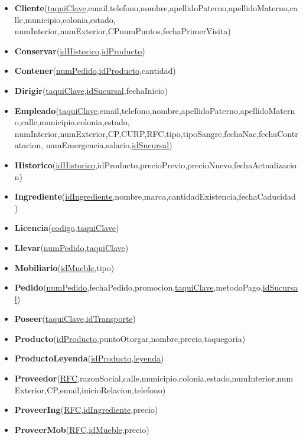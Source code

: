 \documentclass[11pt,letterpaper]{article}
\begin{document}
\begin{itemize}
\item \footnotesize{\textbf{Cliente}(\underline{taquiClave},email,telefono,nombre,apellidoPaterno,apellidoMaterno,calle,municipio,colonia,estado,
numInterior,numExterior,CPnumPuntos,fechaPrimerVisita)}
\item \footnotesize{\textbf{Conservar}(\underline{idHistorico},\underline{idProducto})}
\item \footnotesize{\textbf{Contener}(\underline{numPedido},\underline{idProducto},cantidad)}
\item \footnotesize{\textbf{Dirigir}(\underline{taquiClave},\underline{idSucursal},fechaInicio)}
\item \footnotesize{\textbf{Empleado}(\underline{taquiClave},email,telefono,nombre,apellidoPaterno,apellidoMaterno,calle,municipio,colonia,estado,
numInterior,numExterior,CP,CURP,RFC,tipo,tipoSangre,fechaNac,fechaContratacion,
numEmergencia,salario,\underline{idSucursal})}
\item \footnotesize{\textbf{Historico}(\underline{idHistorico},idProducto,precioPrevio,precioNuevo,fechaActualizacion)}
\item \footnotesize{\textbf{Ingrediente}(\underline{idIngrediente},nombre,marca,cantidadExistencia,fechaCaducidad)}
\item \footnotesize{\textbf{Licencia}(\underline{codigo},\underline{taquiClave}})
\item \footnotesize{\textbf{Llevar}(\underline{numPedido},\underline{taquiClave})}
\item \footnotesize{\textbf{Mobiliario}(\underline{idMueble},tipo)}
\item \footnotesize{\textbf{Pedido}(\underline{numPedido},fechaPedido,promocion,\underline{taquiClave},metodoPago,\underline{idSucursal})}
\item \footnotesize{\textbf{Poseer}(\underline{taquiClave},\underline{idTransporte})}
\item \footnotesize{\textbf{Producto}(\underline{idProducto},puntoOtorgar,nombre,precio,taquegoria)}
\item \footnotesize{\textbf{ProductoLeyenda}(\underline{idProducto,leyenda})}
\item \scriptsize{\textbf{Proveedor}(\underline{RFC},razonSocial,calle,municipio,colonia,estado,numInterior,numExterior,CP,email,inicioRelacion,telefono)}
\item \footnotesize{\textbf{ProveerIng}(\underline{RFC},\underline{idIngrediente},precio)}
\item \footnotesize{\textbf{ProveerMob}(\underline{RFC},\underline{idMueble},precio)}

\end{itemize}
\end{document}
